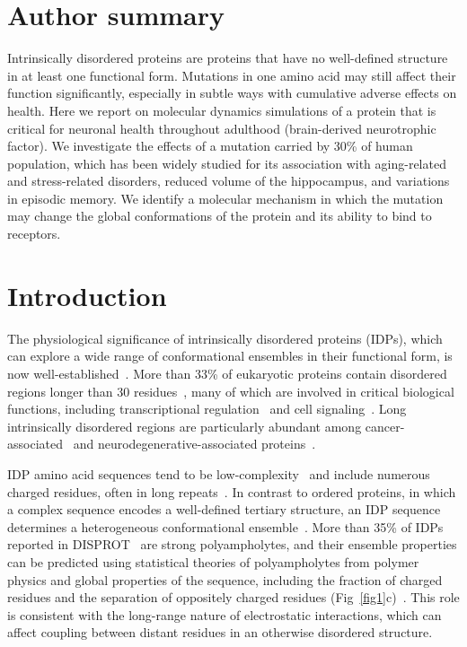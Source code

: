 \documentclass[10pt,letterpaper]{article}
\begin{document}
\section*{Author summary}
Intrinsically disordered proteins are proteins that have no well-defined structure in at least one functional form. Mutations in one amino acid may still affect their function significantly, especially in subtle ways with cumulative adverse effects on health. Here we report on molecular dynamics simulations of a protein that is critical for neuronal health throughout adulthood (brain-derived neurotrophic factor). We investigate the effects of a mutation carried by 30\% of human population, which has been widely studied for its association with aging-related and stress-related disorders, reduced volume of the hippocampus, and variations in episodic memory. We identify a molecular mechanism in which the mutation may change the global conformations of the protein and its ability to bind to receptors.



\section*{Introduction}

The physiological significance of intrinsically disordered proteins (IDPs), which can explore a wide range of conformational ensembles in their functional form, is now well-established~\cite {Uversky2013a,Panchenko2015,Ward2004a,Dyson2005a,Uversky2019}. More than 33\% of eukaryotic proteins contain disordered regions longer than 30 residues~\cite{Ward2004a}, many of which are involved in critical biological functions, including transcriptional regulation~\cite{Minezaki2006a} and cell signaling~\cite{Dunker2005,Wright2015,Vucetic2007}. Long intrinsically disordered regions are particularly abundant among cancer-associated~\cite{Iakoucheva2002} and neurodegenerative-associated proteins~\cite{Habchi2014,Buee2000}. 

IDP amino acid sequences tend to be low-complexity~\cite{Weathers2006,Romero2001a} and include numerous charged residues, often in long repeats~\cite{Uversky2013a,Jorda2010}. In contrast to ordered proteins, in which a complex sequence encodes a well-defined tertiary structure, an IDP sequence determines a heterogeneous conformational ensemble~\cite{Dyson1998,Mukhopadhyay2007,Abeln2008}. More than 35\% of IDPs reported in DISPROT~\cite{Sickmeier2007a} are strong polyampholytes, and their ensemble properties can be predicted using statistical theories of polyampholytes from polymer physics and global properties of the sequence, including the fraction of charged residues and the separation of oppositely charged residues (Fig~\ref{fig1}c)~\cite{Das2015,Das2013,Sawle2015,Firman2018}. This role is consistent with the long-range nature of electrostatic interactions, which can affect coupling between distant residues in an otherwise disordered structure. 
\end{document}

